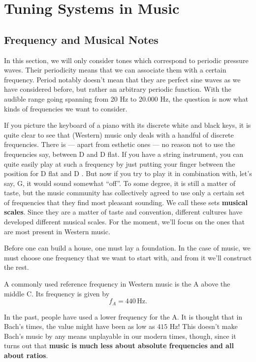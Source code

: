 \section{Tuning Systems in Music}

\subsection{Frequency and Musical Notes}

In this section, we will only consider tones which correspond to periodic pressure waves. Their periodicity means that we can associate them with a certain frequency. Period notably doesn't mean that they are perfect sine waves as we have considered before, but rather an arbitrary periodic function. With the audible range going spanning from 20 Hz to 20.000 Hz, the question is now what kinds of frequencies we want to consider.

If you picture the keyboard of a piano with its discrete white and black keys, it is quite clear to see that (Western) music only deals with a handful of discrete frequencies. There is --- apart from esthetic ones --- no reason not to use the frequencies say, between D and D flat. If you have a string instrument, you can quite easily play at such a frequency by just putting your finger between the position for D flat and D . But now if you try to play it in combination with, let's say, G, it would sound somewhat ``off''. To some degree, it is still a matter of taste, but the music community has collectively agreed to use only a certain set of frequencies that they find most pleasant sounding. We call these sets \textbf{musical scales}. Since they are a matter of taste and convention, different cultures have developed different musical scales. For the moment, we'll focus on the ones that are most present in Western music. 

Before one can build a house, one must lay a foundation. In the case of music, we must choose one frequency that we want to start with, and from it we'll construct the rest.

A commonly used reference frequency in Western music is the A above the middle C. Its frequency is given by 
\begin{equation}
    f_A = 440 \,\text{Hz}.
\end{equation}

In the past, people have used a lower frequency for the A. It is thought that in Bach's times, the value might have been as low as $415$ Hz! This doesn't make Bach's music by any means unplayable in our modern times, though, since it turns out that \textbf{music is much less about absolute frequencies and all about ratios}.

